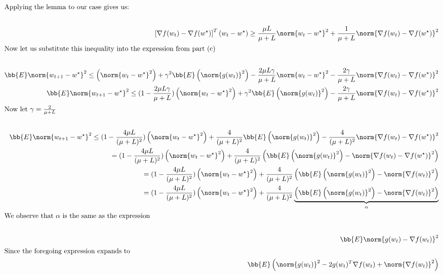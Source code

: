 \documentclass[../main.tex]{subfiles}
\begin{document}
\begin{align*}
    \intertext{Applying the lemma to our case gives us:} \\
    \left[ \nabla f(w_{t}) - \nabla f(w^{\star}) \right]^T(w_{t} - w^{\star}) \geq \frac{\mu L}{\mu + L}\norm{w_{t} - w^{\star}}^2 + \frac{1}{\mu + L}\norm{\nabla f(w_{t}) - \nabla f(w^{\star})}^2 \\
    \intertext{Now let us substitute this inequality into the expression from part (c)} \\
    \bb{E} \norm{w_{t+1} - w^{\star}}^2 \leq \left( \norm{w_{t} - w^{\star}}^2 \right) + \gamma^2 \bb{E}\left( \norm{g(w_t)}^2 \right) - \frac{2 \mu L \gamma}{\mu + L}\norm{w_{t} - w^{\star}}^2 - \frac{2 \gamma}{\mu + L}\norm{\nabla f(w_{t}) - \nabla f(w^{\star})}^2 \\
    \bb{E} \norm{w_{t+1} - w^{\star}}^2 \leq (1 - \frac{2\mu L \gamma}{\mu + L})\left( \norm{w_{t} - w^{\star}}^2 \right) + \gamma^2 \bb{E}\left( \norm{g(w_t)}^2 \right) - \frac{2 \gamma}{\mu + L}\norm{\nabla f(w_{t}) - \nabla f(w^{\star})}^2 \\
    \intertext{Now let $\gamma = \frac{2}{\mu + L}$ }\\
    \bb{E} \norm{w_{t+1} - w^{\star}}^2 \leq (1 - \frac{4\mu L }{(\mu + L)^2})\left( \norm{w_{t} - w^{\star}}^2 \right) + \frac{4}{(\mu + L)^2} \bb{E}\left( \norm{g(w_t)}^2 \right) - \frac{4}{(\mu + L)^2}\norm{\nabla f(w_{t}) - \nabla f(w^{\star})}^2 \\
     = (1 - \frac{4\mu L }{(\mu + L)^2})\left( \norm{w_{t} - w^{\star}}^2 \right) + \frac{4}{(\mu + L)^2} \left(\bb{E}\left( \norm{g(w_t)}^2 \right) - \norm{\nabla f(w_{t}) - \nabla f(w^{\star})}^2\right) \\
     = (1 - \frac{4\mu L }{(\mu + L)^2})\left( \norm{w_{t} - w^{\star}}^2 \right) + \frac{4}{(\mu + L)^2} \left(\bb{E}\left( \norm{g(w_t)}^2 \right) - \norm{\nabla f(w_{t})}^2\right) \\
     = (1 - \frac{4\mu L }{(\mu + L)^2})\left( \norm{w_{t} - w^{\star}}^2 \right) + \frac{4}{(\mu + L)^2} \underbrace{\left(\bb{E}\left( \norm{g(w_t)}^2 \right) - \norm{\nabla f(w_{t})}^2\right)}_{\alpha} \\
     \intertext{We observe that $\alpha$ is the same as the expression} \\
     \bb{E} \norm{g(w_t) - \nabla f(w_t)}^2 \\
     \intertext{Since the foregoing expression expands to}
     \bb{E}\left( \norm{g(w_t)}^2 - 2g(w_t)^T\nabla f(w_t) + \norm{\nabla f(w_t)}^2 \right) \\

\end{align*}
\end{document}
